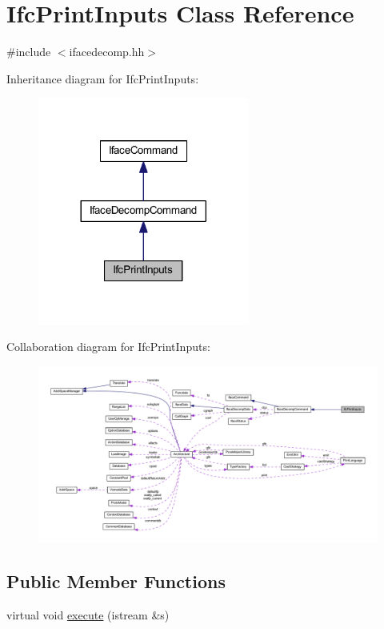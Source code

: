 \hypertarget{class_ifc_print_inputs}{}\section{Ifc\+Print\+Inputs Class Reference}
\label{class_ifc_print_inputs}


{\ttfamily \#include $<$ifacedecomp.\+hh$>$}



Inheritance diagram for Ifc\+Print\+Inputs\+:
\nopagebreak
\begin{figure}[H]
\begin{center}
\leavevmode
\includegraphics[width=197pt]{class_ifc_print_inputs__inherit__graph}
\end{center}
\end{figure}


Collaboration diagram for Ifc\+Print\+Inputs\+:
\nopagebreak
\begin{figure}[H]
\begin{center}
\leavevmode
\includegraphics[width=350pt]{class_ifc_print_inputs__coll__graph}
\end{center}
\end{figure}
\subsection*{Public Member Functions}
\begin{DoxyCompactItemize}
\item 
virtual void \mbox{\hyperlink{class_ifc_print_inputs_af7467e8aed2fa56fb8e909461e022842}{execute}} (istream \&s)
\end{DoxyCompactItemize}
